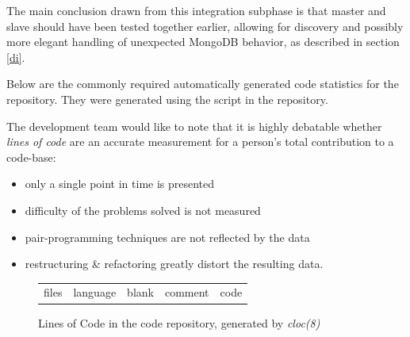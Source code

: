 The main conclusion drawn from this integration subphase is that master and slave should have been tested together earlier, allowing for
discovery and possibly more elegant handling of unexpected MongoDB behavior, as described in section \ref{di}.

Below are the commonly required automatically generated code statistics for the  repository.
They were generated using the  script in the  repository.

The development team would like to note that it is highly debatable whether \textit{lines of code} are an accurate measurement
for a person's total contribution to a code-base:

\begin{itemize}
  \item  only a single point in time is presented
  \item  difficulty of the problems solved is not measured
  \item  pair-programming techniques are not reflected by the data 
  \item  restructuring \& refactoring greatly distort the resulting data.
\end{itemize}

\vspace{1cm}

\begin{figure}[h]
\centering
\begin{tabular}{lllll}
        files  &  language  &  blank  &  comment  &  code \\
        
\end{tabular}
\caption{Lines of Code in the code repository, generated by \textit{cloc(8)}}
\end{figure}


